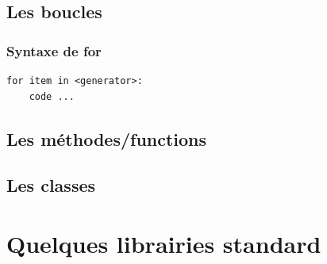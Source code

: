 \subsection{Les boucles}
\begin{frame}[fragile]
  \frametitle{Syntaxe de for}
  \begin{lstlisting}
for item in <generator>:
    code ...
  \end{lstlisting}
\end{frame}

\subsection{Les méthodes/functions}
\begin{frame}[fragile]
\end{frame}

\subsection{Les classes}
\begin{frame}[fragile]
\end{frame}

\section{Quelques librairies standard}
\begin{frame}[fragile]
\end{frame}


